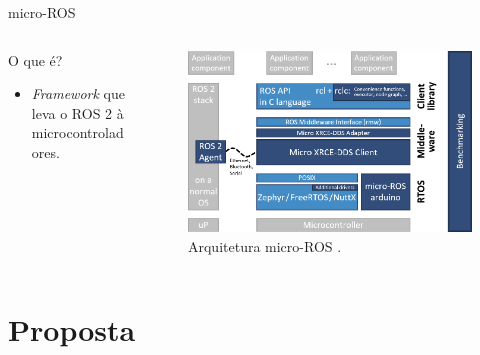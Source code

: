 \documentclass{if-beamer}
\begin{document}
\begin{frame}{micro-ROS}
	
	\begin{columns}
	
	
		\begin{column}{0.4\textwidth}
				
			\begin{block}{O que é?}
			\begin{itemize}
				\item \textit{Framework} que leva o ROS 2 à microcontroladores.
			\end{itemize}
		\end{block}
				
			\end{column}
			
			\begin{column}{0.6\textwidth}
				
		\begin{figure}
			\centering
			\includegraphics[width=\linewidth]{img/micro-ROS_architecture}
			\caption{Arquitetura micro-ROS \cite{microros}.}
			\label{fig:micro-rosarchitecture}
		\end{figure}
			
		\end{column}
		
	\end{columns}


\end{frame}

\section{Proposta}
\end{document}
